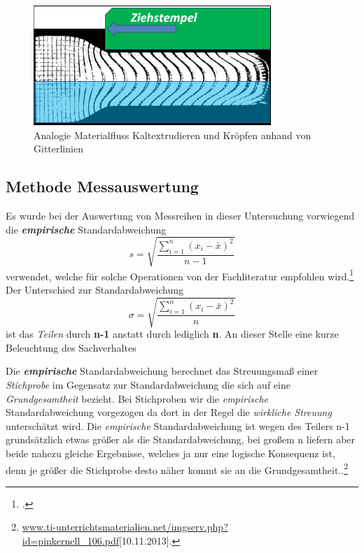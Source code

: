 \documentclass[12pt,a4paper,parskip]{scrartcl}
\begin{document}
\begin{figure}[hbtp]
\centering
\includegraphics[width=0.8\textwidth]{materialflussvergleich}
\caption{Analogie Materialfluss Kaltextrudieren und  Kröpfen anhand von Gitterlinien}
\label{fig:extr}
\end{figure}









  











\subsection{Methode Messauswertung}
Es wurde bei der Auswertung von Messreihen in dieser Untersuchung vorwiegend die \textbf{\emph{empirische}} Standardabweichung 
\begin{equation}s= \sqrt{\frac{\sum \limits_{i=1}^n (x_i - \bar{x})^2}{n-1}}\end{equation}  verwendet, welche für solche Operationen von der Fachliteratur empfohlen wird.\footcite[Vgl.][301]{mf} Der Unterschied zur Standardabweichung \begin{equation} \sigma = \sqrt{\frac{\sum \limits_{i=1}^n (x_i - \bar{x})^2}{n}}\end{equation}  ist das \emph{Teilen} durch \textbf{n-1} anstatt durch lediglich \textbf{n}.
 An dieser Stelle eine kurze Beleuchtung des Sachverhaltes



Die \textbf{\emph{empirische}} Standardabweichung berechnet das Streuungsmaß einer \emph{Stichprobe} im Gegensatz zur Standardabweichung die sich auf eine \emph{Grundgesamtheit} bezieht. Bei Stichproben wir die \emph{empirische} Standardabweichung vorgezogen da dort in der Regel die \emph{wirkliche Streuung} unterschätzt wird. Die \emph{empirische} Standardabweichung ist wegen des Teilers n-1 grundsätzlich etwas größer als die Standardabweichung, bei großem n liefern aber beide nahezu gleiche Ergebnisse, welches ja nur eine logische Konsequenz ist, denn je größer die Stichprobe desto näher kommt sie an die Grundgesamtheit..\footnote{\url{www.ti-unterrichtsmaterialien.net/imgserv.php?id=pinkernell_106.pdf}[10.11.2013].‎}
\end{document}
